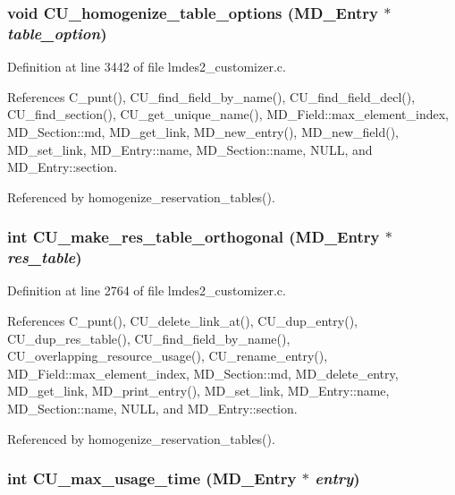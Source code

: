 \subsubsection{\setlength{\rightskip}{0pt plus 5cm}void CU\_\-homogenize\_\-table\_\-options (\bf{MD\_\-Entry} $\ast$ {\em table\_\-option})}\label{lmdes2__customizer_8c_722d64044c191dff9b39056217e3cb8a}




Definition at line 3442 of file lmdes2\_\-customizer.c.

References C\_\-punt(), CU\_\-find\_\-field\_\-by\_\-name(), CU\_\-find\_\-field\_\-decl(), CU\_\-find\_\-section(), CU\_\-get\_\-unique\_\-name(), MD\_\-Field::max\_\-element\_\-index, MD\_\-Section::md, MD\_\-get\_\-link, MD\_\-new\_\-entry(), MD\_\-new\_\-field(), MD\_\-set\_\-link, MD\_\-Entry::name, MD\_\-Section::name, NULL, and MD\_\-Entry::section.

Referenced by homogenize\_\-reservation\_\-tables().
\subsubsection{\setlength{\rightskip}{0pt plus 5cm}int CU\_\-make\_\-res\_\-table\_\-orthogonal (\bf{MD\_\-Entry} $\ast$ {\em res\_\-table})}\label{lmdes2__customizer_8c_5b210418b87ea11a38a9685106fcadb0}




Definition at line 2764 of file lmdes2\_\-customizer.c.

References C\_\-punt(), CU\_\-delete\_\-link\_\-at(), CU\_\-dup\_\-entry(), CU\_\-dup\_\-res\_\-table(), CU\_\-find\_\-field\_\-by\_\-name(), CU\_\-overlapping\_\-resource\_\-usage(), CU\_\-rename\_\-entry(), MD\_\-Field::max\_\-element\_\-index, MD\_\-Section::md, MD\_\-delete\_\-entry, MD\_\-get\_\-link, MD\_\-print\_\-entry(), MD\_\-set\_\-link, MD\_\-Entry::name, MD\_\-Section::name, NULL, and MD\_\-Entry::section.

Referenced by homogenize\_\-reservation\_\-tables().
\subsubsection{\setlength{\rightskip}{0pt plus 5cm}int CU\_\-max\_\-usage\_\-time (\bf{MD\_\-Entry} $\ast$ {\em entry})}\label{lmdes2__customizer_8c_345b1023db31d3c2ed2cde83095ae799}




